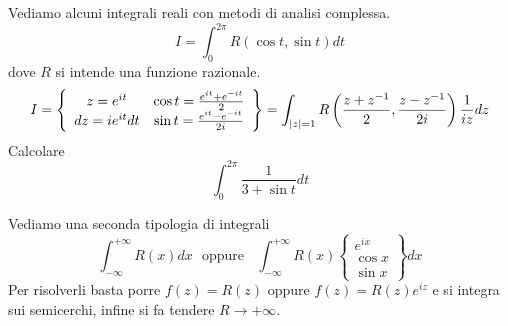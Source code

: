 Vediamo alcuni integrali reali con metodi di analisi complessa.
\begin{equation*}
I = \boxed{\int ^{2\pi }_{0} R\left(\cos t,\sin t\right) dt}
\end{equation*}
dove $R$ si intende una funzione razionale.
\begin{equation*}
I = \left\{
\begin{array}{ c c }
z = e^{it} & \cos t = \frac{e^{it} + e^{ - it}}{2}\\
dz = ie^{it} dt & \sin t = \frac{e^{it} - e^{ - it}}{2i}
\end{array}\right\} = \int _{\left| z\right| = 1} R\left(\frac{z + z^{ - 1}}{2} ,\frac{z - z^{ - 1}}{2i}\right)\frac{1}{iz} dz
\end{equation*}
Calcolare
\begin{equation*}
\int ^{2\pi }_{0}\frac{1}{3 + \sin t} dt
\end{equation*}
\Esercizio{}

Vediamo una seconda tipologia di integrali
\begin{equation*}
\boxed{\int ^{ + \infty }_{ - \infty } R\left(x\right) dx} \ \ \ \text{oppure} \ \ \ \ \boxed{\int ^{ + \infty }_{ - \infty } R\left(x\right)\left\{
\begin{array}{ c }
e^{ix}\\
\cos x\\
\sin x
\end{array}\right\} dx}
\end{equation*}
Per risolverli basta porre $f\left(z\right) = R\left(z\right)$ oppure $f\left(z\right) = R\left(z\right) e^{iz}$ e si integra sui semicerchi, infine si fa tendere $R\rightarrow + \infty $.

